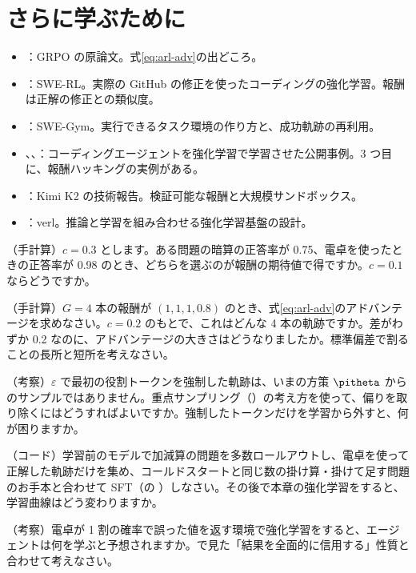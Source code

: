 \section*{さらに学ぶために}
\begin{itemize}
\item \cite{shao2024deepseekmath}：GRPO の原論文。式\eqref{eq:arl-adv}の出どころ。
\item \cite{wei2025swerl}：SWE-RL。実際の GitHub の修正を使ったコーディングの強化学習。報酬は正解の修正との類似度。
\item \cite{pan2025swegym}：SWE-Gym。実行できるタスク環境の作り方と、成功軌跡の再利用。
\item \cite{agentica2025deepswe}、\cite{cao2025skyrl}、\cite{liu2026arcticswe}：コーディングエージェントを強化学習で学習させた公開事例。3 つ目に、報酬ハッキングの実例がある。
\item \cite{bai2025kimik2}：Kimi K2 の技術報告。検証可能な報酬と大規模サンドボックス。
\item \cite{sheng2025hybridflow}：verl。推論と学習を組み合わせる強化学習基盤の設計。
\end{itemize}

\begin{exercises}
\item （手計算）$c=0.3$ とします。ある問題の暗算の正答率が 0.75、電卓を使ったときの正答率が 0.98 のとき、どちらを選ぶのが報酬の期待値で得ですか。$c=0.1$ ならどうですか。
\item （手計算）$G=4$ 本の報酬が $(1, 1, 1, 0.8)$ のとき、式\eqref{eq:arl-adv}のアドバンテージを求めなさい。$c=0.2$ のもとで、これはどんな 4 本の軌跡ですか。差がわずか 0.2 なのに、アドバンテージの大きさはどうなりましたか。標準偏差で割ることの長所と短所を考えなさい。
\item （考察）$\varepsilon$ で最初の役割トークンを強制した軌跡は、いまの方策 $\pitheta$ からのサンプルではありません。重点サンプリング（）の考え方を使って、偏りを取り除くにはどうすればよいですか。強制したトークンだけを学習から外すと、何が困りますか。
\item （コード）学習前のモデルで加減算の問題を多数ロールアウトし、電卓を使って正解した軌跡だけを集め、コールドスタートと同じ数の掛け算・掛けて足す問題のお手本と合わせて SFT（の ）しなさい。その後で本章の強化学習をすると、学習曲線はどう変わりますか。
\item （考察）電卓が 1 割の確率で誤った値を返す環境で強化学習をすると、エージェントは何を学ぶと予想されますか。で見た「結果を全面的に信用する」性質と合わせて考えなさい。
\end{exercises}
